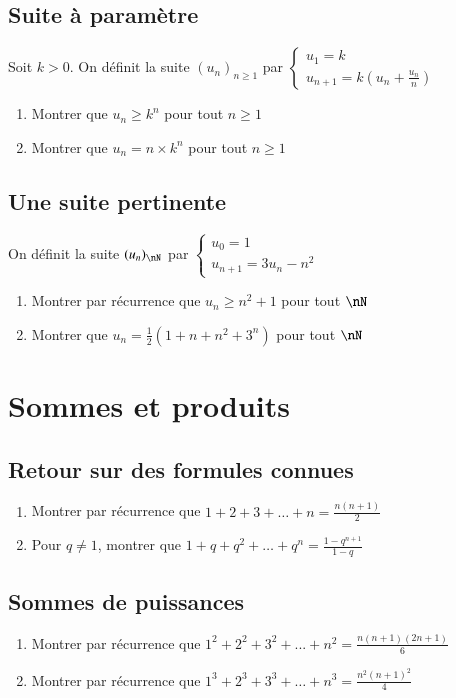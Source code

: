 \documentclass[oneside,12pt]{article}          %
\begin{document}
\subsection{Suite à paramètre}
Soit $k>0$. On définit la suite $(u_n)_{n\geq1}$ par $\begin{cases}u_1=k\\u_{n+1}=k(u_n+\frac{u_n}{n})\end{cases}$
    \begin{enumerate}
        \item Montrer que $u_n\geq k^n$ pour tout $n\geq1$
        \item Montrer que $u_n=n\times k^n$ pour tout $n\geq1$
    \end{enumerate}



\subsection{Une suite pertinente}
On définit la suite $(u_n)_{\nN}$ par $\begin{cases}u_0=1\\u_{n+1}=3u_n-n^2\end{cases}$
\begin{enumerate}
	\item Montrer par récurrence que $u_n\geq n^2+1$ pour tout $\nN$
	\item Montrer que $u_n=\frac{1}{2}(1+n+n^2+3^n)$ pour tout $\nN$
\end{enumerate}
    
    

\section{Sommes et produits}


\subsection{Retour sur des formules connues}
\begin{enumerate}
    \item Montrer par récurrence que $1+2+3+\ldots+n=\frac{n(n+1)}{2}$
    \item Pour $q\neq1$, montrer que $1+q+q^2+\ldots+q^n=\frac{1-q^{n+1}}{1-q}$
\end{enumerate}



\subsection{Sommes de puissances}
\begin{enumerate}

    \item Montrer par récurrence que $1^2+2^2+3^2+...+n^2=\frac{n(n+1)(2n+1)}{6}$
    \item Montrer par récurrence que $1^3+2^3+3^3+\ldots+n^3=\frac{n^2(n+1)^2}{4}$
\end{enumerate}
\end{document}
